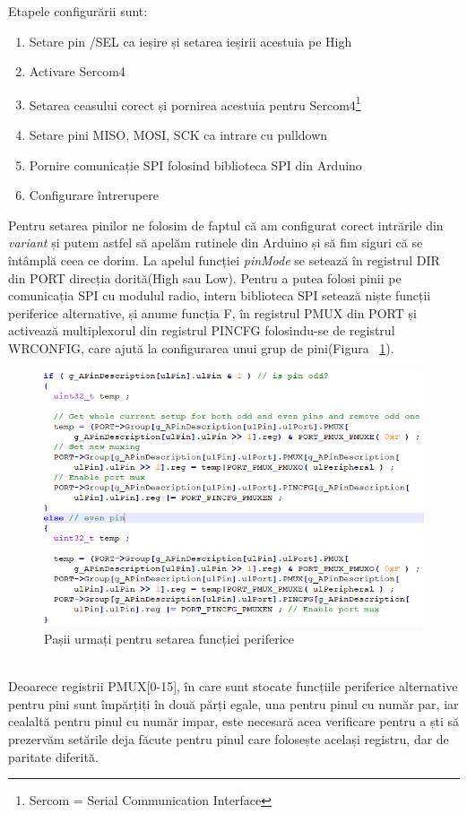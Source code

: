 \documentclass[12pt,a4paper]{report}
\begin{document}
Etapele configurării sunt:
\begin{enumerate}
	\item{Setare pin /SEL ca ieșire și setarea ieșirii acestuia pe High}
	\item{Activare Sercom4}
	\item{Setarea ceasului corect și pornirea acestuia pentru Sercom4\footnote{Sercom = Serial Communication Interface}}
	\item{Setare pini MISO, MOSI, SCK ca intrare cu pulldown}
	\item{Pornire comunicație SPI folosind biblioteca SPI din Arduino}
	\item{Configurare întrerupere}
\end{enumerate}

Pentru setarea pinilor ne folosim de faptul că am configurat corect intrările din \textit{variant} și putem astfel să apelăm rutinele din Arduino și să fim siguri că se întâmplă ceea ce dorim. La apelul funcției \textit{pinMode} se setează în registrul DIR din PORT direcția dorită(High sau Low). Pentru a putea folosi pinii pe comunicația SPI cu modulul radio, intern biblioteca SPI setează niște funcții periferice alternative, și anume funcția F, în registrul PMUX din PORT și activează multiplexorul din registrul PINCFG folosindu-se de registrul WRCONFIG, care ajută la configurarea unui grup de pini(Figura ~\ref{fig:pinperipheral}).
\begin{figure}[h]
\centering
\includegraphics[scale=0.8]{pics/pinperipheral.png}
  \caption{Pașii urmați pentru setarea funcției periferice}
  \label{fig:pinperipheral}
\end{figure}\\
Deoarece registrii PMUX[0-15], în care sunt stocate funcțiile periferice alternative pentru pini sunt împărțiți în două părți egale, una pentru pinul cu număr par, iar cealaltă pentru pinul cu număr impar, este necesară acea verificare pentru a ști să prezervăm setările deja făcute pentru pinul care folosește același registru, dar de paritate diferită.\\
\end{document}
